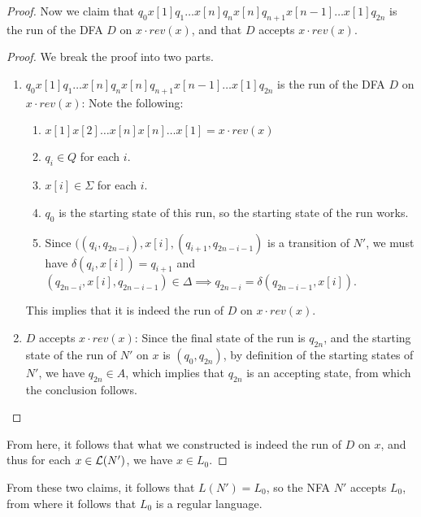 \begin{soln}
\begin{proof}
        Now we claim that $q_0 x[1] q_1 \ldots x[n] q_n x[n] q_{n+1} x[n-1] \ldots x[1] q_{2n}$ is the run of the DFA $D$ on $x \cdot rev(x)$, and that $D$ accepts $x \cdot rev(x)$.

        \begin{proof}
        We break the proof into two parts.
            \begin{enumerate}
                \item $q_0 x[1] q_1 \ldots x[n] q_n x[n] q_{n+1} x[n-1] \ldots x[1] q_{2n}$ is the run of the DFA $D$ on $x \cdot rev(x)$: Note the following:
                    \begin{enumerate}
                        \item $x[1]x[2] \ldots x[n] x[n] \ldots x[1] = x \cdot rev(x)$
                        \item $q_i \in Q$ for each $i$.
                        \item $x[i] \in \Sigma$ for each $i$.
                        \item $q_0$ is the starting state of this run, so the starting state of the run works.
                        \item Since $((q_i, q_{2n-i}), x[i], (q_{i+1}, q_{2n-i-1})$ is a transition of $N'$, we must have $\delta(q_i, x[i]) = q_{i+1}$ and $(q_{2n-i}, x[i], q_{2n-i-1}) \in
                            \Delta \implies q_{2n-i} = \delta(q_{2n-i-1}, x[i])$.
                    \end{enumerate}
                    This implies that it is indeed the run of $D$ on $x \cdot rev(x)$.
                \item $D$ accepts $x \cdot rev(x)$: Since the final state of the run is $q_{2n}$, and the starting state of the run of $N'$ on $x$ is $(q_0, q_{2n})$, by definition of the
                    starting states of $N'$, we have $q_{2n} \in A$, which implies that $q_{2n}$ is an accepting state, from which the conclusion follows.
            \end{enumerate}
        \end{proof}
        From here, it follows that what we constructed is indeed the run of $D$ on $x$, and thus for each $x \in \mathcal{L}(N')$, we have $x \in L_0$.
    \end{proof}
    From these two claims, it follows that $L(N') = L_0$, so the NFA $N'$ accepts $L_0$, from where it follows that $L_0$ is a regular language.
\end{soln}


